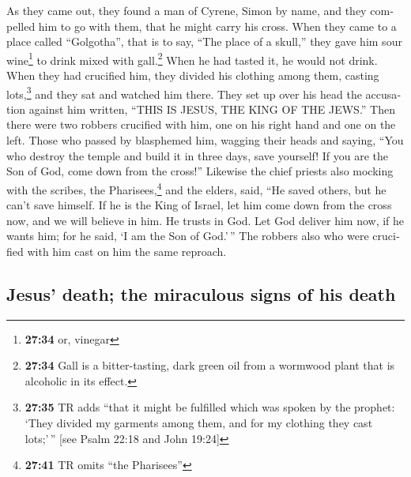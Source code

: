 \begin{paracol}{2}
\begin{otherlanguage}{english}
 As they came out, they found a man of Cyrene, Simon by
name, and they compelled him to go with them, that he might carry his
cross.  When they came to a place called ``Golgotha'',
that is to say, ``The place of a skull,''  they gave him
sour wine\footnote{\textbf{27:34} or, vinegar} to drink mixed with
gall.\footnote{\textbf{27:34} Gall is a bitter-tasting, dark green oil
  from a wormwood plant that is alcoholic in its effect.} When he had
tasted it, he would not drink.  When they had crucified
him, they divided his clothing among them, casting lots,\footnote{\textbf{27:35}
  TR adds ``that it might be fulfilled which was spoken by the prophet:
  `They divided my garments among them, and for my clothing they cast
  lots;'\,'' {[}see Psalm 22:18 and John 19:24{]}}  and
they sat and watched him there.  They set up over his
head the accusation against him written, ``THIS IS JESUS, THE KING OF
THE JEWS.''  Then there were two robbers crucified with
him, one on his right hand and one on the left.  Those
who passed by blasphemed him, wagging their heads  and
saying, ``You who destroy the temple and build it in three days, save
yourself! If you are the Son of God, come down from the cross!''
 Likewise the chief priests also mocking with the
scribes, the Pharisees,\footnote{\textbf{27:41} TR omits ``the
  Pharisees''} and the elders, said,  ``He saved others,
but he can't save himself. If he is the King of Israel, let him come
down from the cross now, and we will believe in him.  He
trusts in God. Let God deliver him now, if he wants him; for he said, `I
am the Son of God.'\,''  The robbers also who were
crucified with him cast on him the same reproach.

\hypertarget{jesus-death-the-miraculous-signs-of-his-death}{%
\subsection{Jesus' death; the miraculous signs of his
death}\label{jesus-death-the-miraculous-signs-of-his-death}}


\end{otherlanguage}
\end{paracol}
